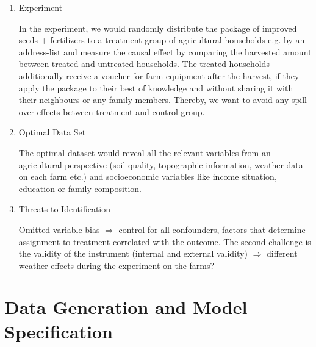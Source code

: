 \begin{enumerate}
\item Experiment

In the experiment, we would randomly distribute the package of improved seeds + fertilizers to a treatment group of agricultural households e.g. by an address-list and measure the causal effect by comparing the harvested amount between treated and untreated households. The treated households additionally receive a voucher for farm equipment after the harvest, if they apply the package to their best of knowledge and without sharing it with their neighbours or any family members. Thereby, we want to avoid any spill-over effects between treatment and control group.

\item Optimal Data Set

The optimal dataset would reveal all the relevant variables from an agricultural perspective (soil quality, topographic information, weather data on each farm etc.) and socioeconomic variables like income situation, education or family composition.

\item Threats to Identification

Omitted variable bias $\Rightarrow$ control for all confounders, factors that determine assignment to treatment correlated with the outcome. The second challenge is the validity of the instrument (internal and external validity) $\Rightarrow$ different weather effects during the experiment on the farms?

\end{enumerate}

\section{Data Generation and Model Specification} \label{sec:data}


